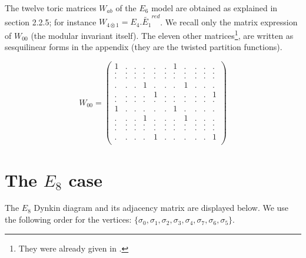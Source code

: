 \documentclass[a4paper,11pt]{article}
\let\sect=\section
\def\section{\newpage\sect}
\def \otimesdot {\stackrel{\cdot}{\otimes}}
\begin{document}
The twelve toric matrices $W_{ab}$ of the $E_{6}$ model are obtained
as explained in section 2.2.5;  for instance $W_{4\otimesdot 1}=
E_{4}.\widetilde{E_{1}}^{red}$.
We recall only the matrix expression
of $W_{00}$ (the modular invariant itself).  The eleven other
matrices\footnote{They were already given in \cite{Coque:qtetra}.}, are
written as sesquilinear forms  in
the appendix (they are the twisted partition functions).

$$
W_{00}=\left( \begin{array}{ccccccccccc}
1 & . & . & . & . & . & 1 & . & . & . & . \\
. & . & . & . & . & . & . & . & . & . & . \\
. & . & . & . & . & . & . & . & . & . & . \\
. & . & . & 1 & . & . & . & 1 & . & . & . \\
. & . & . & . & 1 & . & . & . & . & . & 1 \\
. & . & . & . & . & . & . & . & . & . & . \\
1 & . & . & . & . & . & 1 & . & . & . & . \\
. & . & . & 1 & . & . & . & 1 & . & . & . \\
. & . & . & . & . & . & . & . & . & . & . \\
. & . & . & . & . & . & . & . & . & . & . \\
. & . & . & . & 1 & . & . & . & . & . & 1 \\
\end{array}
\right)
$$





\section{The $E_{8}$ case}

The $E_8$ Dynkin diagram and its adjacency matrix are displayed
below. We use the following order for the vertices: $\{\sigma_0,
\sigma_1, \sigma_2,
\sigma_3, \sigma_4, \sigma_7, \sigma_6, \sigma_5 \}$.
\end{document}
